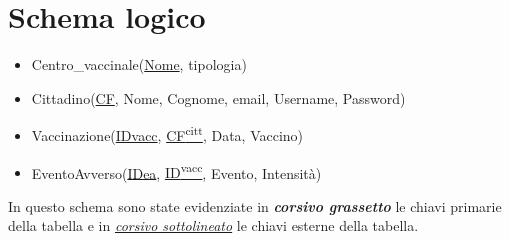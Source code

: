 \section{Schema logico}

	\begin{itemize}
		\item Centro\_vaccinale(\underline{Nome}, tipologia)
		
		\item Cittadino(\underline{CF}, Nome, Cognome, email, Username, Password)
		
		\item Vaccinazione(\underline{IDvacc}, \underline{CF\textsuperscript{citt}}, Data, Vaccino)
		
		\item EventoAvverso(\underline{IDea}, \underline{ID\textsuperscript{vacc}}, Evento, Intensità)
	\end{itemize}
	
	In questo schema sono state evidenziate in \textbf{\textit{corsivo grassetto}} le chiavi primarie della tabella e in \underline{\textit{corsivo sottolineato}} le chiavi esterne della tabella.